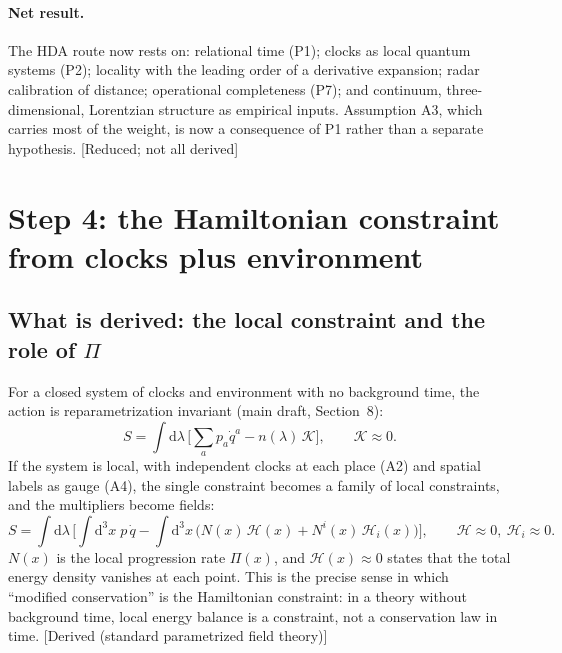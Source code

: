 \documentclass[11pt]{article}
\newcommand{\Pg}{\Pi}
\newcommand{\dd}{\mathrm{d}}
\newcommand{\st}[1]{\textsf{\small[#1]}}
\theoremstyle{plain}
\theoremstyle{definition}
\theoremstyle{remark}
\begin{document}
\paragraph{Net result.} The HDA route now rests on: relational time (P1); clocks as local quantum systems (P2); locality with the leading order of a derivative expansion; radar calibration of distance; operational completeness (P7); and continuum, three-dimensional, Lorentzian structure as empirical inputs. Assumption A3, which carries most of the weight, is now a consequence of P1 rather than a separate hypothesis. \st{Reduced; not all derived}

\section{Step 4: the Hamiltonian constraint from clocks plus environment}
\label{sec:constraint}

\subsection{What is derived: the local constraint and the role of \texorpdfstring{$\Pg$}{Pi}}

For a closed system of clocks and environment with no background time, the action is reparametrization invariant (main draft, Section~8):
\begin{equation}
S=\int\dd\lambda\,\Big[\textstyle\sum_ap_a\dot q^a-n(\lambda)\,\mathcal K\Big],\qquad \mathcal K\approx0 .
\end{equation}
If the system is local, with independent clocks at each place (A2) and spatial labels as gauge (A4), the single constraint becomes a family of local constraints, and the multipliers become fields:
\begin{equation}
S=\int\dd\lambda\,\Big[\int\dd^3x\;p\,\dot q-\int\dd^3x\,\big(N(x)\,\mathcal H(x)+N^i(x)\,\mathcal H_i(x)\big)\Big],
\qquad \mathcal H\approx0,\ \mathcal H_i\approx0 .
\end{equation}
$N(x)$ is the local progression rate $\Pg(x)$, and $\mathcal H(x)\approx0$ states that the total energy density vanishes at each point. This is the precise sense in which ``modified conservation'' is the Hamiltonian constraint: in a theory without background time, local energy balance is a constraint, not a conservation law in time. \st{Derived (standard parametrized field theory)}
\end{document}
